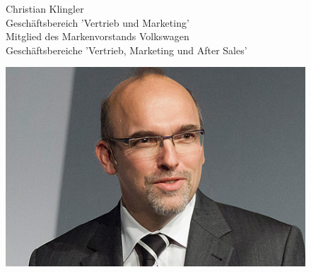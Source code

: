 \documentclass[12pt]{article}
\begin{document}
\begin{figure}[here!]
	\centering
	\begin{minipage}[h]{0.65\textwidth}
		Christian Klingler\\
		Geschäftsbereich 'Vertrieb und Marketing'\\
		Mitglied des Markenvorstands Volkswagen\\
		Geschäftsbereiche 'Vertrieb, Marketing und After Sales'
	\end{minipage}
	\begin{minipage}[h]{0.10\textwidth}
		\hspace{1cm} 
	\end{minipage}
	\begin{minipage}[h]{0.20\textwidth}
		\centering
		\includegraphics[width=1.0\textwidth]{images/ChristianKlingler.jpg}
		\label{fig:vorstandvw3}
	\end{minipage}
\end{figure}
\end{document}
